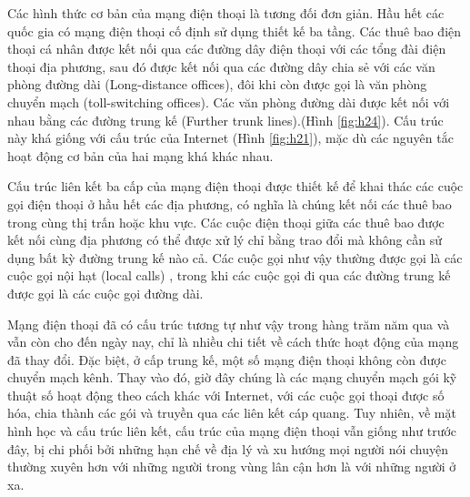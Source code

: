 Các hình thức cơ bản của mạng điện thoại là tương đối đơn giản. Hầu hết các quốc gia có mạng điện thoại cố định sử dụng thiết kế ba tầng. Các thuê bao điện thoại cá nhân được kết nối qua các đường dây điện thoại với các tổng đài điện thoại địa phương, sau đó được kết nối qua các đường dây chia sẻ với các văn phòng đường dài (Long-distance offices), đôi khi còn được gọi là văn phòng chuyển mạch (toll-switching offices). Các văn phòng đường dài được kết nối với nhau bằng các đường trung kế (Further trunk lines).(Hình \ref{fig:h24}). Cấu trúc này khá giống với cấu trúc của Internet (Hình \ref{fig:h21}), mặc dù các nguyên tắc hoạt động cơ bản của hai mạng khá khác nhau.\par
Cấu trúc liên kết ba cấp của mạng điện thoại được thiết kế để khai thác các cuộc gọi điện thoại ở hầu hết các địa phương, có nghĩa là chúng kết nối các thuê bao trong cùng thị trấn hoặc khu vực. Các cuộc điện thoại giữa các thuê bao được kết nối cùng địa phương có thể được xử lý chỉ bằng trao đổi mà không cần sử dụng bất kỳ đường trung kế nào cả. Các cuộc gọi như vậy thường được gọi là các cuộc gọi nội hạt (local calls) , trong khi các cuộc gọi đi qua các đường trung kế được gọi là các cuộc gọi đường dài. \par
Mạng điện thoại đã có cấu trúc tương tự như vậy trong hàng trăm năm qua và vẫn còn cho đến ngày nay, chỉ là nhiều chi tiết về cách thức hoạt động của mạng đã thay đổi. Đặc biệt, ở cấp trung kế, một số mạng điện thoại không còn được chuyển mạch kênh. Thay vào đó, giờ đây chúng là các mạng chuyển mạch gói kỹ thuật số hoạt động theo cách khác với Internet, với các cuộc gọi thoại được số hóa, chia thành các gói và truyền qua các liên kết cáp quang. Tuy nhiên, về mặt hình học và cấu trúc liên kết, cấu trúc của mạng điện thoại vẫn giống như trước đây, bị chi phối bởi những hạn chế về địa lý và xu hướng mọi người nói chuyện thường xuyên hơn với những người trong vùng lân cận hơn là với những người ở xa.\par

